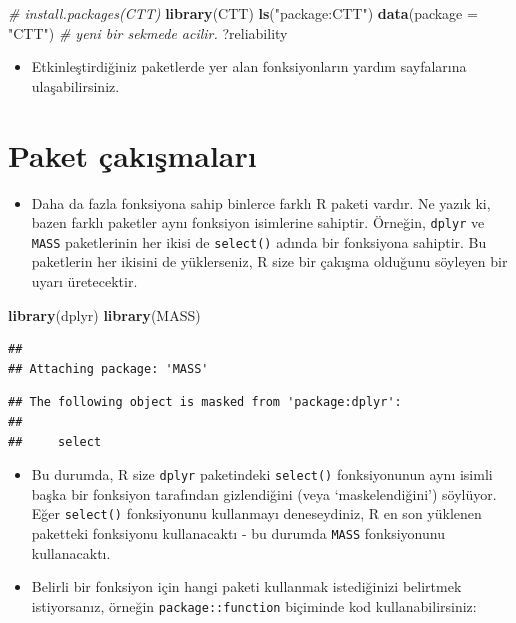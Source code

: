 \documentclass[
  oneside]{book}
\newenvironment{Shaded}{\begin{snugshade}}{\end{snugshade}}
\newcommand{\AttributeTok}[1]{\textcolor[rgb]{0.13,0.29,0.53}{#1}}
\newcommand{\CommentTok}[1]{\textcolor[rgb]{0.56,0.35,0.01}{\textit{#1}}}
\newcommand{\FunctionTok}[1]{\textcolor[rgb]{0.13,0.29,0.53}{\textbf{#1}}}
\newcommand{\NormalTok}[1]{#1}
\newcommand{\StringTok}[1]{\textcolor[rgb]{0.31,0.60,0.02}{#1}}
\providecommand{\tightlist}{%
  \setlength{\itemsep}{0pt}\setlength{\parskip}{0pt}}
\begin{document}
\begin{Shaded}
\begin{Highlighting}[]
\CommentTok{\# install.packages(CTT)}
\FunctionTok{library}\NormalTok{(CTT)}
\FunctionTok{ls}\NormalTok{(}\StringTok{"package:CTT"}\NormalTok{) }
\FunctionTok{data}\NormalTok{(}\AttributeTok{package =} \StringTok{"CTT"}\NormalTok{) }\CommentTok{\# yeni bir sekmede acilir.}
\NormalTok{?reliability}
\end{Highlighting}
\end{Shaded}

\begin{itemize}
\tightlist
\item
  Etkinleştirdiğiniz paketlerde yer alan fonksiyonların yardım sayfalarına ulaşabilirsiniz.
\end{itemize}

\hypertarget{conflicts}{%
\section{Paket çakışmaları}\label{conflicts}}

\begin{itemize}
\tightlist
\item
  Daha da fazla fonksiyona sahip binlerce farklı R paketi vardır. Ne yazık ki, bazen farklı paketler aynı fonksiyon isimlerine sahiptir. Örneğin, \texttt{dplyr} ve \texttt{MASS} paketlerinin her ikisi de \texttt{select()} adında bir fonksiyona sahiptir. Bu paketlerin her ikisini de yüklerseniz, R size bir çakışma olduğunu söyleyen bir uyarı üretecektir.
\end{itemize}

\begin{Shaded}
\begin{Highlighting}[]
\FunctionTok{library}\NormalTok{(dplyr)}
\FunctionTok{library}\NormalTok{(MASS)}
\end{Highlighting}
\end{Shaded}

\begin{verbatim}
## 
## Attaching package: 'MASS'
\end{verbatim}

\begin{verbatim}
## The following object is masked from 'package:dplyr':
## 
##     select
\end{verbatim}

\begin{itemize}
\item
  Bu durumda, R size \texttt{dplyr} paketindeki \texttt{select()} fonksiyonunun aynı isimli başka bir fonksiyon tarafından gizlendiğini (veya `maskelendiğini') söylüyor. Eğer \texttt{select()} fonksiyonunu kullanmayı deneseydiniz, R en son yüklenen paketteki fonksiyonu kullanacaktı - bu durumda \texttt{MASS} fonksiyonunu kullanacaktı.
\item
  Belirli bir fonksiyon için hangi paketi kullanmak istediğinizi belirtmek istiyorsanız, örneğin \texttt{package::function} biçiminde kod kullanabilirsiniz:
\end{itemize}
\end{document}
